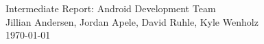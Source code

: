\documentclass[12pt]{article}
\begin{document}
 \begin{titlepage}
    \vspace*{\fill}
    \begin{center}
      {\Huge Intermediate Report: Android Development Team}\\[0.5cm]
      {\Large Jillian Andersen, Jordan Apele, David Ruhle, Kyle Wenholz}\\[0.4cm]
      \today
    \end{center}
    \vspace*{\fill}
  \end{titlepage}
  
\tableofcontents
\newpage
\end{document}
